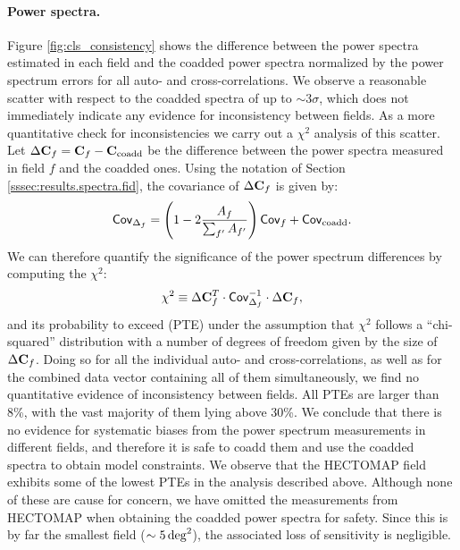 \documentclass[a4paper,11pt]{article}
\begin{document}
      \paragraph{Power spectra.} Figure \ref{fig:cls_consistency} shows the difference between the power spectra estimated in each field and the coadded power spectra normalized by the power spectrum errors for all auto- and cross-correlations. We observe a reasonable scatter with respect to the coadded spectra of up to $\sim3\sigma$, which does not immediately indicate any evidence for inconsistency between fields. As a more quantitative check for inconsistencies we carry out a $\chi^2$ analysis of this scatter. Let  $\Delta {\bf C}_f={\bf C}_f-{\bf C}_{\rm coadd}$ be the difference between the power spectra measured in field $f$ and the coadded ones. Using the notation of Section \ref{sssec:results.spectra.fid}, the covariance of $\Delta {\bf C}_f$ is given by:
      \begin{equation}
        {\sf Cov}_{\Delta_f}=\left(1-2\frac{A_f}{\sum_{f'}A_{f'}}\right){\sf Cov}_f+{\sf Cov}_{\rm coadd}.
      \end{equation}
      We can therefore quantify the significance of the power spectrum differences by computing the $\chi^2$:
      \begin{equation}
        \chi^2\equiv\Delta{\bf C}_f^T\cdot{\sf Cov}_{\Delta_f}^{-1}\cdot\Delta{\bf C}_f,
      \end{equation}
      and its probability to exceed (PTE) under the assumption that $\chi^2$ follows a ``chi-squared'' distribution with a number of degrees of freedom given by the size of $\Delta{\bf C}_f$. Doing so for all the individual auto- and cross-correlations, as well as for the combined data vector containing all of them simultaneously, we find no quantitative evidence of inconsistency between fields. All PTEs are larger than 8\%, with the vast majority of them lying above 30\%. We conclude that there is no evidence for systematic biases from the power spectrum measurements in different fields, and therefore it is safe to coadd them and use the coadded spectra to obtain model constraints. We observe that the HECTOMAP field exhibits some of the lowest PTEs in the analysis described above. Although none of these are cause for concern, we have omitted the measurements from HECTOMAP when obtaining the coadded power spectra for safety. Since this is by far the smallest field ($\sim5\,{\rm deg}^2$), the associated loss of sensitivity is negligible.
\end{document}
